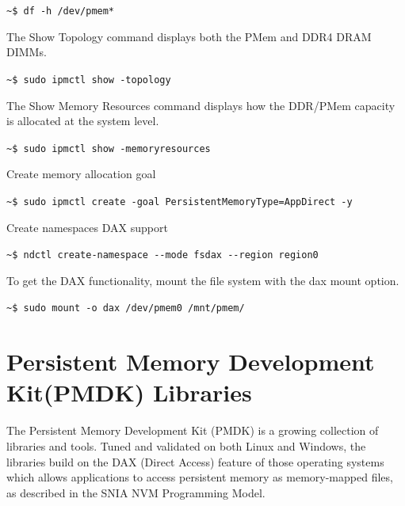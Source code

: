 \documentclass[11pt,swedish, openany, oneside]{book}
\begin{document}
\verb|~$ df -h /dev/pmem*|

\noindent The Show Topology command displays both the PMem and DDR4 DRAM DIMMs.

\verb|~$ sudo ipmctl show -topology|

\noindent The Show Memory Resources command displays how the DDR/PMem capacity is allocated at the system level.

\verb|~$ sudo ipmctl show -memoryresources|

\noindent Create memory allocation goal

\verb|~$ sudo ipmctl create -goal PersistentMemoryType=AppDirect -y|

\noindent Create namespaces DAX support

\verb|~$ ndctl create-namespace --mode fsdax --region region0|

\noindent To get the DAX functionality, mount the file system with the dax mount option.

\verb|~$ sudo mount -o dax /dev/pmem0 /mnt/pmem/|

\section{Persistent Memory Development Kit(PMDK) Libraries\cite{pmdk, Scargall2020}}
The Persistent Memory Development Kit (PMDK) is a growing collection of libraries and tools. Tuned and validated on both Linux and Windows, the libraries build on the DAX (Direct Access) feature of those operating systems which allows applications to access persistent memory as memory-mapped files, as described in the SNIA NVM Programming Model.
\end{document}
